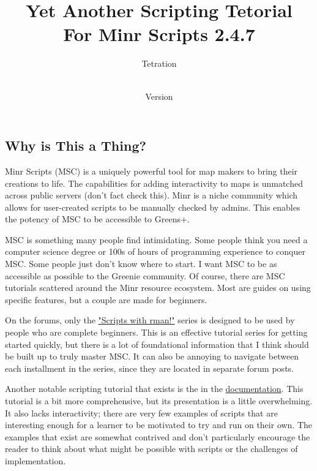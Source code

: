 \documentclass[oneside]{book}
\begin{document}
\pagestyle{empty}

\title{Yet Another Scripting Tetorial \\
        \large For Minr Scripts 2.4.7}
\author{Tetration}
\date{\vhCurrentDate \\Version \vhCurrentVersion}
\maketitle


\frontmatter
{} 

\begin{preface}
\section*{Why is This a Thing?}
Minr Scripts (MSC) is a uniquely powerful tool for map makers to bring their creations to life. The capabilities for adding interactivity to maps is unmatched across public servers (don't fact check this). Minr is a niche community which allows for user-created scripts to be manually checked by admins. This enables the potency of MSC to be accessible to Greens+.

MSC is something many people find intimidating. Some people think you need a computer science degree or 100s of hours of programming experience to conquer MSC. Some people just don't know where to start. I want MSC to be as accessible as possible to the Greenie community. Of course, there are MSC tutorials scattered around the Minr resource ecosystem. Most are guides on using specific features, but a couple are made for beginners.

On the forums, only the \href{https://forums.minr.org/threads/scripts-with-rman-1-basic-script-understanding.3193/}{"Scripts with rman!"} series is designed to be used by people who are complete beginners. This is an effective tutorial series for getting started quickly, but there is a lot of foundational information that I think should be built up to truly master MSC. It can also be annoying to navigate between each installment in the series, since they are located in separate forum posts.

Another notable scripting tutorial that exists is the in the \href{https://msc-documentation.readthedocs.io/en/latest/tutorial.html}{documentation}. This tutorial is a bit more comprehensive, but its presentation is a little overwhelming. It also lacks interactivity; there are very few examples of scripts that are interesting enough for a learner to be motivated to try and run on their own. The examples that exist are somewhat contrived and don't particularly encourage the reader to think about what might be possible with scripts or the challenges of implementation.


\end{preface}
\end{document}
